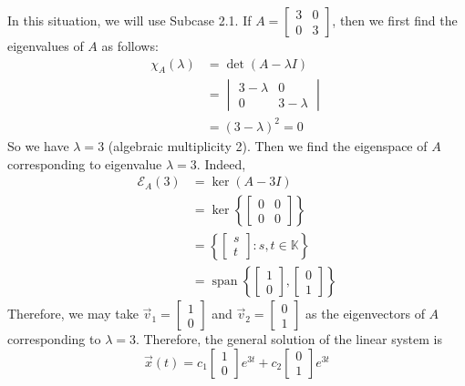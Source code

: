 \documentclass[11pt]{book}
\theoremstyle{definition}\newtheorem{definition}[subsection]{Definition}
\theoremstyle{definition}\newtheorem{example}[subsection]{Example}
\theoremstyle{definition}\newtheorem{notation}[subsection]{Notation}
\theoremstyle{definition}\newtheorem{remark}[subsection]{Remark}
\theoremstyle{theorem}\newtheorem{theorem}[subsection]{Theorem}
\theoremstyle{theorem}\newtheorem{lemma}[subsection]{Lemma}
\theoremstyle{theorem}\newtheorem{proposition}[subsection]{Proposition}
\theoremstyle{theorem}\newtheorem{corollary}[subsection]{Corollary}
\theoremstyle{theorem}\newtheorem{case}{Case}
\theoremstyle{remark}\newtheorem{subcase}{Subcase}[case]
\newcommand{\K}{\mathbb{K}}
\newcommand{\E}{\mathcal{E}}
\DeclareMathOperator{\Span}{span}
\begin{document}
In this situation, we will use Subcase 2.1. If $A = \begin{bmatrix} 3 & 0 \\ 0 & 3 \end{bmatrix}$, then we first find the eigenvalues of $A$ as follows:
\begin{align*}
    \chi_A(\lambda) &= \det(A - \lambda I) \\
    &= \begin{vmatrix} 3 - \lambda & 0 \\ 0 & 3 - \lambda \end{vmatrix} \\
    &= (3 - \lambda)^2 = 0
\end{align*}
So we have $\lambda = 3$ (algebraic multiplicity 2). Then we find the eigenspace of $A$ corresponding to eigenvalue $\lambda = 3$. Indeed,
\begin{align*}
    \E_A(3) &= \ker(A - 3I) \\
    &= \ker\left\{\begin{bmatrix} 0 & 0 \\ 0 & 0 \end{bmatrix}\right\} \\
    &= \left\{\begin{bmatrix} s \\ t \end{bmatrix} : s, t \in \K\right\} \\
    &= \Span\left\{\begin{bmatrix} 1 \\ 0 \end{bmatrix}, \begin{bmatrix} 0 \\ 1 \end{bmatrix}\right\}
\end{align*}
Therefore, we may take $\vec{v}_1 = \begin{bmatrix} 1 \\ 0 \end{bmatrix}$ and $\vec{v}_2 = \begin{bmatrix} 0 \\ 1 \end{bmatrix}$ as the eigenvectors of $A$ corresponding to $\lambda = 3$. Therefore, the general solution of the linear system is
\begin{equation*}
    \vec{x}(t) = c_1\begin{bmatrix} 1 \\ 0 \end{bmatrix}e^{3t} + c_2\begin{bmatrix} 0 \\ 1 \end{bmatrix}e^{3t}
\end{equation*}
\end{document}
